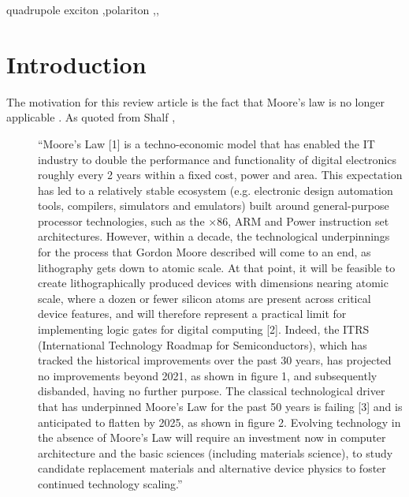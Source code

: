 \documentclass[a4paper,fleqn]{cas-sc}
\begin{document}
\begin{keywords}
quadrupole exciton \sep polariton \sep \WGM \sep \BEC
\end{keywords}

\maketitle

\section{Introduction}

The motivation for this review article is the fact that Moore's law is no longer applicable \cite{moore2021cramming}.
As quoted from Shalf \cite{shalf2020future}, 
\begin{description}
\item[] ``Moore’s Law [1] is a 
techno-economic model that has enabled the IT industry to double the 
performance and functionality of digital electronics roughly 
every 2 years within a fixed cost, power and area. This expectation 
has led to a relatively stable ecosystem (e.g. electronic design 
automation tools, compilers, simulators and emulators) built around 
general-purpose processor technologies, such as the ×86, ARM and 
Power instruction set architectures. However, within a decade, the 
technological underpinnings for the process that Gordon Moore 
described will come to an end, as lithography gets down to atomic 
scale. At that point, it will be feasible to create lithographically 
produced devices with dimensions nearing atomic scale, where a dozen or 
fewer silicon atoms are present across critical device features, and 
will therefore represent a practical limit for implementing logic 
gates for digital computing [2]. Indeed, the ITRS (International Technology Roadmap for Semiconductors), which has tracked the historical improvements over the past 30 years, has projected no 
improvements beyond 2021, as shown in figure 1, and 
subsequently disbanded, having no further purpose. 
The classical technological driver that has underpinned Moore’s Law 
for the past 50 years is failing [3] and is anticipated to 
flatten by 2025, as shown in figure 2. Evolving technology in the 
absence of Moore’s Law will require an investment now in computer 
architecture and the basic sciences (including materials science), 
to study candidate replacement materials and alternative device 
physics to foster continued technology scaling.'' 
\end{description}
\end{document}
